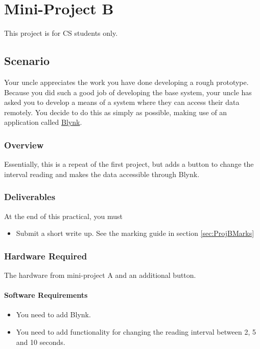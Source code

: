 \chapter{Mini-Project B}
This project is for CS students only.\\

\section{Scenario}
Your uncle appreciates the work you have done developing a rough prototype. Because you did such a good job of developing the base system, your uncle has asked you to develop a means of a system where they can access their data remotely. You decide to do this as simply as possible, making use of an application called \href{https://blynk.io/}{Blynk}.



\subsection{Overview}
Essentially, this is a repeat of the first project, but adds a button to change the interval reading and makes the data accessible through Blynk.

\subsection{Deliverables}
At the end of this practical, you must
\begin{itemize}
    \item Submit a short write up. See the marking guide in section \ref{sec:ProjBMarks}
\end{itemize}

\subsection{Hardware Required}
The hardware from mini-project A and an additional button.

\subsubsection{Software Requirements}
\begin{itemize}
    \item You need to add Blynk.
    \item You need to add functionality for changing the reading interval between 2, 5 and 10 seconds.
\end{itemize}

